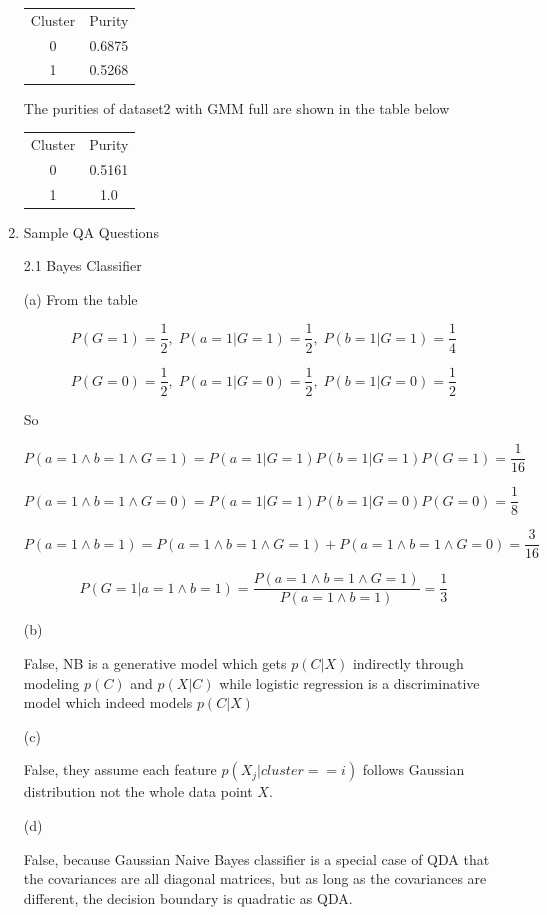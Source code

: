 \documentclass[11pt]{article}
\begin{document}
\begin{enumerate}
\begin{center}
  \begin{tabular}{ |c|c| }
   \hline
   Cluster & Purity \\
   0 & 0.6875 \\
   1 & 0.5268 \\
   \hline
  \end{tabular}
\end{center}

The purities of dataset2 with GMM full are shown in the table below

\begin{center}
  \begin{tabular}{ |c|c| }
   \hline
   Cluster & Purity \\
   0 & 0.5161 \\
   1 & 1.0 \\
   \hline
  \end{tabular}
\end{center}

\item
Sample QA Questions

\medskip

2.1 Bayes Classifier

\medskip

(a)
From the table

$$
P(G=1) = \frac{1}{2} ,\;
P(a=1|G=1) = \frac{1}{2} ,\;
P(b=1|G=1) = \frac{1}{4}
$$

$$
P(G=0) = \frac{1}{2} ,\;
P(a=1|G=0) = \frac{1}{2} ,\;
P(b=1|G=0) = \frac{1}{2}
$$

So

$$
P(a=1 \land b=1 \land G=1) = P(a=1|G=1)P(b=1|G=1)P(G=1) = \frac{1}{16}
$$

$$
P(a=1 \land b=1 \land G=0) = P(a=1|G=1)P(b=1|G=0)P(G=0) = \frac{1}{8}
$$

$$
P(a=1 \land b=1) = P(a=1 \land b=1 \land G=1) + P(a=1 \land b=1 \land G=0) = \frac{3}{16}
$$

$$
P(G=1|a=1 \land b=1) = \frac{P(a=1 \land b=1 \land G=1)}{P(a=1 \land b=1)} = \frac{1}{3}
$$

\medskip

(b)

False, NB is a generative model which gets $p(C|X)$ indirectly through modeling $p(C)$ and $p(X|C)$ while logistic regression is a discriminative model which indeed models $p(C|X)$

\medskip

(c)

False, they assume each feature $p(X_j|cluster==i)$ follows Gaussian distribution not the whole data point $X$.

\medskip

(d)

False, because Gaussian Naive Bayes classifier is a special case of QDA that the covariances are all diagonal matrices, but as long as the covariances are different, the decision boundary is quadratic as QDA.


\end{enumerate}
\end{document}

